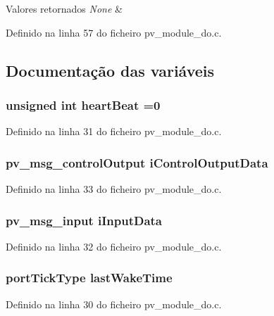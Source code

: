\begin{DoxyRetVals}{Valores retornados}
{\em None} & \\
\hline
\end{DoxyRetVals}


Definido na linha 57 do ficheiro pv\-\_\-module\-\_\-do.\-c.



\subsection{Documentação das variáveis}
\hypertarget{group__app__do_ga24475be702ffcc5a6f0a5557040368ef}{
\subsubsection[{heart\-Beat}]{\setlength{\rightskip}{0pt plus 5cm}unsigned int heart\-Beat =0}}\label{group__app__do_ga24475be702ffcc5a6f0a5557040368ef}


Definido na linha 31 do ficheiro pv\-\_\-module\-\_\-do.\-c.

\hypertarget{group__app__do_gacabca53fbaffdbf13b8e5a1c29b73bc4}{
\subsubsection[{i\-Control\-Output\-Data}]{\setlength{\rightskip}{0pt plus 5cm}pv\-\_\-msg\-\_\-control\-Output i\-Control\-Output\-Data}}\label{group__app__do_gacabca53fbaffdbf13b8e5a1c29b73bc4}


Definido na linha 33 do ficheiro pv\-\_\-module\-\_\-do.\-c.

\hypertarget{group__app__do_gac40b8cfe5fd2000670ad57fe3e75ec89}{
\subsubsection[{i\-Input\-Data}]{\setlength{\rightskip}{0pt plus 5cm}pv\-\_\-msg\-\_\-input i\-Input\-Data}}\label{group__app__do_gac40b8cfe5fd2000670ad57fe3e75ec89}


Definido na linha 32 do ficheiro pv\-\_\-module\-\_\-do.\-c.

\hypertarget{group__app__do_gaa8db3871cb5f64abbd94ddd5a1db73a6}{
\subsubsection[{last\-Wake\-Time}]{\setlength{\rightskip}{0pt plus 5cm}port\-Tick\-Type last\-Wake\-Time}}\label{group__app__do_gaa8db3871cb5f64abbd94ddd5a1db73a6}


Definido na linha 30 do ficheiro pv\-\_\-module\-\_\-do.\-c.

